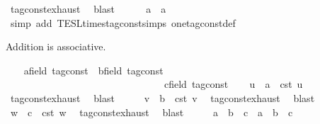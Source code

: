 \begin{isabellebody}
\ tag{\isacharunderscore}const{\isachardot}exhaust\ \isamarkupfalse%
\ blast\isanewline
\ \ \isamarkupfalse%
\ {\isacartoucheopen}{}\ {\isacharasterisk}\ a\ {\isacharequal}\ a{\isacartoucheclose}\isanewline
\ \ \ \ \isamarkupfalse%
\ {\isacharparenleft}simp\ add{\isacharcolon}\ TESL{\isachardot}times{\isacharunderscore}tag{\isacharunderscore}const{\isachardot}simps\ one{\isacharunderscore}tag{\isacharunderscore}const{\isacharunderscore}def{\isacharparenright}\isanewline
{}\isamarkupfalse%
%
\begin{isamarkuptext}%
Addition is associative.%
\end{isamarkuptext}\isamarkuptrue%
\ \ \isamarkupfalse%
\ a{\isacharcolon}{\isacharcolon}{\isacartoucheopen}{\isacharprime}{\isasymtau}{\isacharcolon}{\isacharcolon}field\ tag{\isacharunderscore}const{\isacartoucheclose}\ \ b{\isacharcolon}{\isacharcolon}{\isacartoucheopen}{\isacharprime}{\isasymtau}{\isacharcolon}{\isacharcolon}field\ tag{\isacharunderscore}const{\isacartoucheclose}\isanewline
\ \ \ \ \ \ \ \ \ \ \ \ \ \ \ \ \ \ \ \ \ \ \ \ \ \ \ \ \ \ \ \ c{\isacharcolon}{\isacharcolon}{\isacartoucheopen}{\isacharprime}{\isasymtau}{\isacharcolon}{\isacharcolon}field\ tag{\isacharunderscore}const{\isacartoucheclose}\isanewline
\ \ \isamarkupfalse%
\ u\ \ {\isacartoucheopen}a\ {\isacharequal}\ {\isasymtau}\isactrlsub c\isactrlsub s\isactrlsub t\ u{\isacartoucheclose}\ \isamarkupfalse%
\ tag{\isacharunderscore}const{\isachardot}exhaust\ \isamarkupfalse%
\ blast\isanewline
\ \ \isamarkupfalse%
\ \isamarkupfalse%
\ v\ \ {\isacartoucheopen}b\ {\isacharequal}\ {\isasymtau}\isactrlsub c\isactrlsub s\isactrlsub t\ v{\isacartoucheclose}\ \isamarkupfalse%
\ tag{\isacharunderscore}const{\isachardot}exhaust\ \isamarkupfalse%
\ blast\isanewline
\ \ \isamarkupfalse%
\ \isamarkupfalse%
\ w\ \ {\isacartoucheopen}c\ {\isacharequal}\ {\isasymtau}\isactrlsub c\isactrlsub s\isactrlsub t\ w{\isacartoucheclose}\ \isamarkupfalse%
\ tag{\isacharunderscore}const{\isachardot}exhaust\ \isamarkupfalse%
\ blast\isanewline
\ \ \isamarkupfalse%
\ \isamarkupfalse%
\ {\isacartoucheopen}a\ {\isacharplus}\ b\ {\isacharplus}\ c\ {\isacharequal}\ a\ {\isacharplus}\ {\isacharparenleft}b\ {\isacharplus}\ c{\isacharparenright}{\isacartoucheclose}\isanewline

\end{isabellebody}
